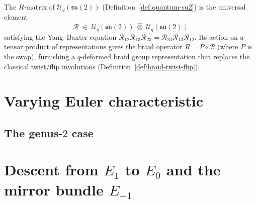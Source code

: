\begin{remark}
\label{rem:r-matrix-braiding}
The $R$-matrix of $\mathcal{U}_q(\mathfrak{su}(2))$
(Definition~\ref{def:quantum-su2}) is the universal element
\[
  \mathcal{R}\;\in\;
  \mathcal{U}_q(\mathfrak{su}(2))\;\hat{\otimes}\;
  \mathcal{U}_q(\mathfrak{su}(2))
\]
satisfying the Yang--Baxter equation
$\mathcal{R}_{12}\mathcal{R}_{13}\mathcal{R}_{23}
=\mathcal{R}_{23}\mathcal{R}_{13}\mathcal{R}_{12}$.
Its action on a tensor product of representations gives the braid
operator $\check{R}=P\circ\mathcal{R}$ (where $P$ is the swap),
furnishing a $q$-deformed braid group representation that replaces
the classical twist/flip involutions
(Definition~\ref{def:braid-twist-flip}).
\end{remark}


\section{Varying Euler characteristic}
\label{sec:varying-euler}



\subsection{The genus-$2$ case}
\label{subsec:genus-2}



\section{Descent from $E_1$ to $E_0$ and the mirror bundle $E_{-1}$}
\label{sec:descent-mirror}

